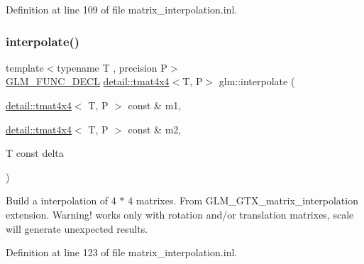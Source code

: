 Definition at line 109 of file matrix\+\_\+interpolation.\+inl.

\mbox{\label{group__gtx__matrix__interpolation_gad7dbb702234767be1b4d3c191a2327ac}} 
\subsubsection{\texorpdfstring{interpolate()}{interpolate()}}
{\footnotesize\ttfamily template$<$typename T , precision P$>$ \\
\hyperlink{setup_8hpp_ab2d052de21a70539923e9bcbf6e83a51}{G\+L\+M\+\_\+\+F\+U\+N\+C\+\_\+\+D\+E\+CL} \hyperlink{structglm_1_1detail_1_1tmat4x4}{detail\+::tmat4x4}$<$T, P$>$ glm\+::interpolate (\begin{DoxyParamCaption}\item[{\hyperlink{structglm_1_1detail_1_1tmat4x4}{detail\+::tmat4x4}$<$ T, P $>$ const \&}]{m1,  }\item[{\hyperlink{structglm_1_1detail_1_1tmat4x4}{detail\+::tmat4x4}$<$ T, P $>$ const \&}]{m2,  }\item[{T const}]{delta }\end{DoxyParamCaption})}

Build a interpolation of 4 $\ast$ 4 matrixes. From G\+L\+M\+\_\+\+G\+T\+X\+\_\+matrix\+\_\+interpolation extension. Warning! works only with rotation and/or translation matrixes, scale will generate unexpected results. 

Definition at line 123 of file matrix\+\_\+interpolation.\+inl.

